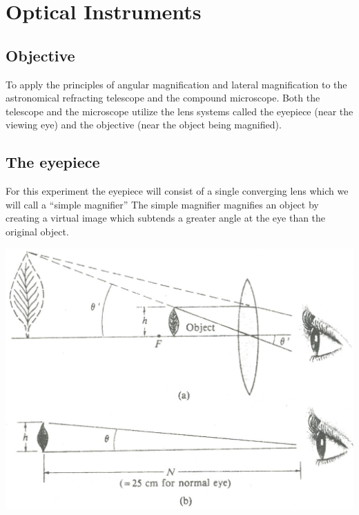 \chapter{Optical Instruments}

\begin{multicols}{2}
\section{Objective}
To apply the principles of angular magnification and lateral magnification to the astronomical refracting telescope and the compound microscope. Both the telescope and the microscope utilize the lens systems called the eyepiece (near the viewing eye) and the objective (near the object being magnified).

\section{The eyepiece} For this experiment the eyepiece will consist of a single converging lens which we will call a ``simple magnifier'' The simple magnifier magnifies an object by creating a virtual image which subtends a greater angle at the eye than the original object.


\begin{center}
  \includegraphics[scale=0.7]{5bgraf/mag}
  \label{f:mag}
\end{center}



\end{multicols}
